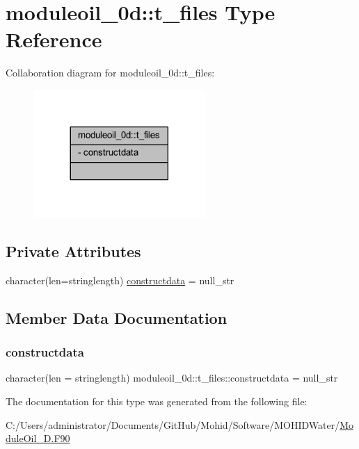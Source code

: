 \hypertarget{structmoduleoil__0d_1_1t__files}{}\section{moduleoil\+\_\+0d\+:\+:t\+\_\+files Type Reference}
\label{structmoduleoil__0d_1_1t__files}


Collaboration diagram for moduleoil\+\_\+0d\+:\+:t\+\_\+files\+:\nopagebreak
\begin{figure}[H]
\begin{center}
\leavevmode
\includegraphics[width=185pt]{structmoduleoil__0d_1_1t__files__coll__graph}
\end{center}
\end{figure}
\subsection*{Private Attributes}
\begin{DoxyCompactItemize}
\item 
character(len=stringlength) \mbox{\hyperlink{structmoduleoil__0d_1_1t__files_a5ac5fcf31bd8de7a7a929086a4188093}{constructdata}} = null\+\_\+str
\end{DoxyCompactItemize}


\subsection{Member Data Documentation}
\mbox{\label{structmoduleoil__0d_1_1t__files_a5ac5fcf31bd8de7a7a929086a4188093}} 
\subsubsection{\texorpdfstring{constructdata}{constructdata}}
{\footnotesize\ttfamily character(len = stringlength) moduleoil\+\_\+0d\+::t\+\_\+files\+::constructdata = null\+\_\+str\hspace{0.3cm}{\ttfamily [private]}}



The documentation for this type was generated from the following file\+:\begin{DoxyCompactItemize}
\item 
C\+:/\+Users/administrator/\+Documents/\+Git\+Hub/\+Mohid/\+Software/\+M\+O\+H\+I\+D\+Water/\mbox{\hyperlink{_module_oil__0_d_8_f90}{Module\+Oil\+\_\+D.\+F90}}\end{DoxyCompactItemize}
